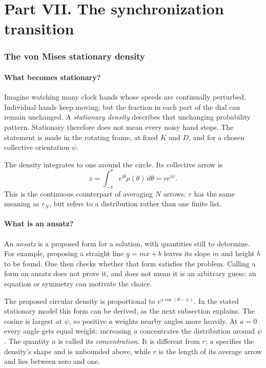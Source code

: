 \documentclass[11pt]{article}
\begin{document}
\part*{Part VII. The synchronization transition}
\section{The von Mises stationary density}
\label{sec:vonmises}

\subsection{What becomes stationary?}

Imagine watching many clock hands whose speeds are continually perturbed.
Individual hands keep moving, but the fraction in each part of the dial can
remain unchanged. A \emph{stationary density} describes that unchanging
probability pattern. Stationary therefore does not mean every noisy hand
stops. The statement is made in the rotating frame, at fixed $K$ and $D$,
and for a chosen collective orientation $\psi$.

The density integrates to one around the circle. Its collective arrow is
\[
 z=\int_{-\pi}^{\pi}e^{\mathrm{i}\theta}\rho(\theta)\,d\theta
   =r e^{\mathrm{i}\psi}.
\]
This is the continuous counterpart of averaging $N$ arrows: $r$ has the same
meaning as $r_N$, but refers to a distribution rather than one finite list.

\subsection{What is an ansatz?}

An \emph{ansatz} is a proposed form for a solution, with quantities still to
determine. For example, proposing a straight line $y=mx+b$ leaves its slope
$m$ and height $b$ to be found. One then checks whether that form satisfies the
problem. Calling a form an ansatz does not prove it, and does not mean it is
an arbitrary guess: an equation or symmetry can motivate the choice.

The proposed circular density is proportional to
$e^{a\cos(\theta-\psi)}$. In the stated stationary model this form can be
derived, as the next subsection explains. The cosine is largest at $\psi$, so positive
$a$ weights nearby angles more heavily. At $a=0$ every angle gets equal
weight; increasing $a$ concentrates the distribution around $\psi$. The
quantity $a$ is called its \emph{concentration}. It is different from $r$:
$a$ specifies the density's shape and is unbounded above, while $r$ is the
length of its average arrow and lies between zero and one.
\end{document}
